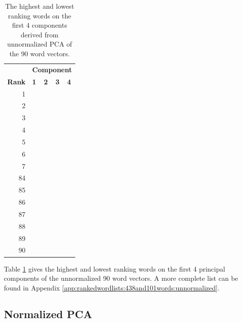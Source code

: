 \documentclass[10pt,letterpaper]{book}
\begin{document}
\begin{table}[!htbp]
    \begin{tabular}{| rllll | }
        \hline
         & \multicolumn{4}{c|}{\textbf{Component}} \\
        \textbf{Rank} & \textbf{1} & \textbf{2} & \textbf{3} & \textbf{4} \\
        \hline
        1 &  &  &  &  \\
        2 &  &  &  &  \\
        3 &  &  &  &  \\
        4 &  &  &  &  \\
        5 &  &  &  &  \\
        6 &  &  &  &  \\
        7 &  &  &  &  \\
        \hline
        84 &  &  &  &  \\
        85 &  &  &  &  \\
        86 &  &  &  &  \\
        87 &  &  &  &  \\
        88 &  &  &  &  \\
        89 &  &  &  &  \\
        90 &  &  &  &  \\
        \hline
    \end{tabular}
    \caption{The highest and lowest ranking words on the first 4 components 
    derived from unnormalized PCA of the 90 word vectors.}
    \label{tab:438and101wordsRankingsUnnormalizedPCA}
\end{table}

Table \ref{tab:438and101wordsRankingsUnnormalizedPCA} gives the highest and lowest
ranking words on the first 4 principal components of the unnormalized 90 word 
vectors. A more complete list can be found in Appendix 
\ref{app:rankedwordlists:438and101words:unnormalized}.


\subsection{Normalized PCA}
\end{document}
